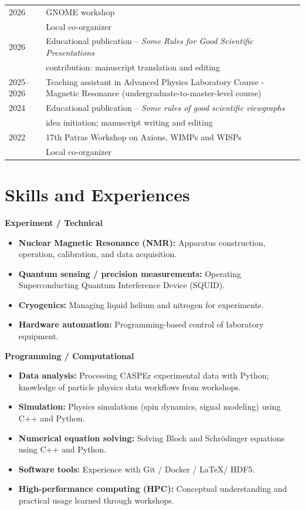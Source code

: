 \noindent\begin{tabular}{@{}lp{\dimexpr\linewidth-2.5cm\relax}@{}}
2026 & GNOME workshop  \\
& Local co-organizer \\
2026 & Educational publication – \textit{Some Rules for Good Scientific Presentations} \\
 & contribution: manuscript translation and editing\\
2025--2026 & Teaching assistant in Advanced Physics Laboratory Course - Magnetic Resonance (undergraduate-to-master-level course)\\
2024 & Educational publication – \textit{Some rules of good scientific viewgraphs} \\
 & idea initiation; manuscript writing and editing\\
2022 & 17th Patras Workshop on Axions, WIMPs and WISPs  \\
& Local co-organizer
\end{tabular}


\section*{Skills and Experiences}

\noindent\textbf{Experiment / Technical}
\begin{itemize}
    \item \textbf{Nuclear Magnetic Resonance (NMR):} Apparatus construction, operation, calibration, and data acquisition.
    \item \textbf{Quantum sensing / precision measurements:} Operating Superconducting Quantum Interference Device (SQUID).
    \item \textbf{Cryogenics:} Managing liquid helium and nitrogen for experiments.
    \item \textbf{Hardware automation:} Programming-based control of laboratory equipment.

\end{itemize}

\noindent\textbf{Programming / Computational}
\begin{itemize}
    \item \textbf{Data analysis:} Processing CASPEr experimental data with Python; knowledge of particle physics data workflows from workshops.
    \item \textbf{Simulation:} Physics simulations (spin dynamics, signal modeling) using C++ and Python.
    \item \textbf{Numerical equation solving:} Solving Bloch and Schrödinger equations using C++ and Python.
    \item \textbf{Software tools:} Experience with Git / Docker / \LaTeX / HDF5.
    \item \textbf{High-performance computing (HPC):} Conceptual understanding and practical usage learned through workshops.
\end{itemize}

